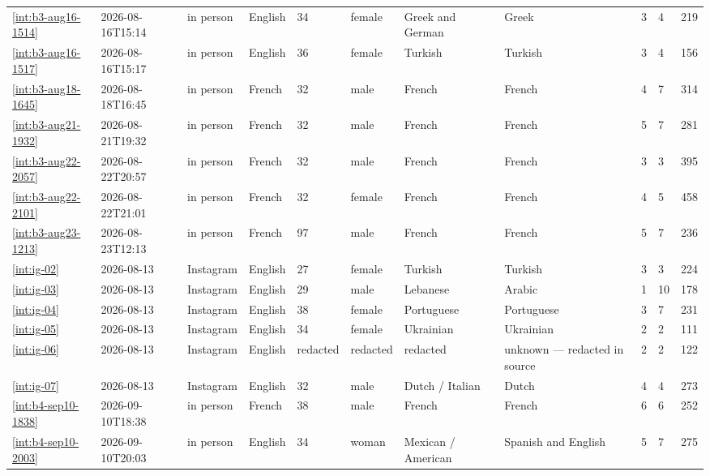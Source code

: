 \begin{landscape}
\begin{longtable}{@{}p{2.2cm}p{2.0cm}p{1.6cm}p{1.4cm}p{0.8cm}p{1.3cm}p{2.4cm}p{1.8cm}p{0.6cm}p{0.6cm}p{1.0cm}@{}}
\ref{int:b3-aug16-1514} & 2026-08-16T15:14 & in person & English & 34 & female & Greek and German & Greek & 3 & 4 & 219 \\
\ref{int:b3-aug16-1517} & 2026-08-16T15:17 & in person & English & 36 & female & Turkish & Turkish & 3 & 4 & 156 \\
\ref{int:b3-aug18-1645} & 2026-08-18T16:45 & in person & French & 32 & male & French & French & 4 & 7 & 314 \\
\ref{int:b3-aug21-1932} & 2026-08-21T19:32 & in person & French & 32 & male & French & French & 5 & 7 & 281 \\
\ref{int:b3-aug22-2057} & 2026-08-22T20:57 & in person & French & 32 & male & French & French & 3 & 3 & 395 \\
\ref{int:b3-aug22-2101} & 2026-08-22T21:01 & in person & French & 32 & female & French & French & 4 & 5 & 458 \\
\ref{int:b3-aug23-1213} & 2026-08-23T12:13 & in person & French & 97 & male & French & French & 5 & 7 & 236 \\
\ref{int:ig-02} & 2026-08-13 & Instagram & English & 27 & female & Turkish & Turkish & 3 & 3 & 224 \\
\ref{int:ig-03} & 2026-08-13 & Instagram & English & 29 & male & Lebanese & Arabic & 1 & 10 & 178 \\
\ref{int:ig-04} & 2026-08-13 & Instagram & English & 38 & female & Portuguese & Portuguese & 3 & 7 & 231 \\
\ref{int:ig-05} & 2026-08-13 & Instagram & English & 34 & female & Ukrainian & Ukrainian & 2 & 2 & 111 \\
\ref{int:ig-06} & 2026-08-13 & Instagram & English & redacted & redacted & redacted & unknown — redacted in source & 2 & 2 & 122 \\
\ref{int:ig-07} & 2026-08-13 & Instagram & English & 32 & male & Dutch / Italian & Dutch & 4 & 4 & 273 \\
\ref{int:b4-sep10-1838} & 2026-09-10T18:38 & in person & French & 38 & male & French & French & 6 & 6 & 252 \\
\ref{int:b4-sep10-2003} & 2026-09-10T20:03 & in person & English & 34 & woman & Mexican / American & Spanish and English & 5 & 7 & 275 \\
\end{longtable}
\end{landscape}
